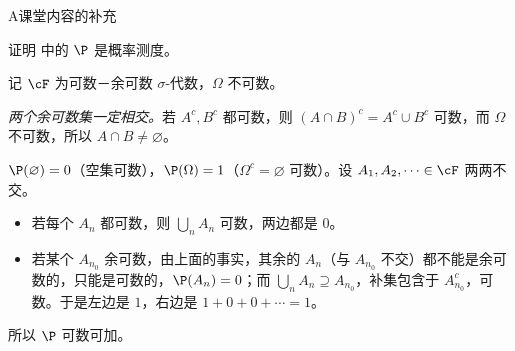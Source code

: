 \label{hw:measures}


\begin{exercises}{A}{课堂内容的补充}
\item\label{ex:measures:A1} 证明 中的 $\P$ 是概率测度。
\begin{solution}
记 $\cF$ 为可数－余可数 $\sigma$-代数，$\Omega$ 不可数。

\emph{两个余可数集一定相交。}若 $A^c,B^c$ 都可数，则 $(A\cap B)^c=A^c\cup B^c$ 可数，而 $\Omega$ 不可数，所以 $A\cap B\neq\varnothing$。

$\P(\varnothing)=0$（空集可数），$\P(\Omega)=1$（$\Omega^c=\varnothing$ 可数）。设 $A_1,A_2,\dots\in\cF$ 两两不交。
\begin{itemize}
\item 若每个 $A_n$ 都可数，则 $\bigcup_nA_n$ 可数，两边都是 $0$。
\item 若某个 $A_{n_0}$ 余可数，由上面的事实，其余的 $A_n$（与 $A_{n_0}$ 不交）都不能是余可数的，只能是可数的，$\P(A_n)=0$；而 $\bigcup_nA_n\supseteq A_{n_0}$，补集包含于 $A_{n_0}^c$，可数。于是左边是 $1$，右边是 $1+0+0+\cdots=1$。
\end{itemize}
所以 $\P$ 可数可加。
\end{solution}


\end{exercises}
